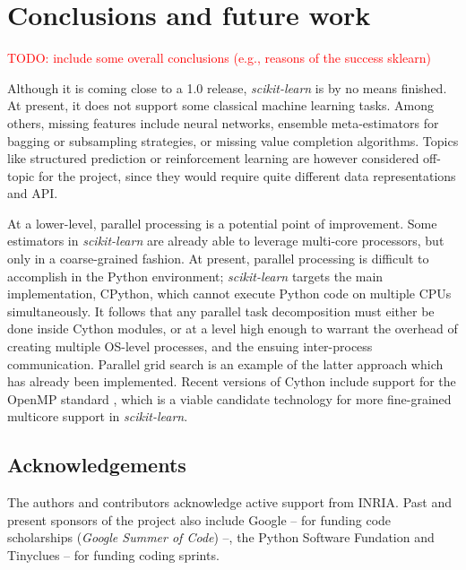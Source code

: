 \documentclass{llncs}
\newcommand{\sklearn}{\textit{scikit-learn}\xspace}
\DeclareRobustCommand{\VAN}[3]{#2}
\begin{document}
\section{Conclusions and future work}
\label{sec:conclusions}

\textcolor{red}{TODO: include some overall conclusions (e.g., reasons of the success sklearn)}

Although it is coming close to a 1.0 release, \sklearn is by no means finished.
At present, it does not support some classical machine learning tasks. Among
others, missing features include neural networks, ensemble meta-estimators for
bagging or subsampling strategies, or missing value completion algorithms.
Topics like structured prediction or reinforcement learning are however
considered off-topic for the project, since they would require quite different
data representations and API.

At a lower-level, parallel processing is a potential point of improvement.
Some estimators in \sklearn are already able to leverage multi-core processors,
but only in a coarse-grained fashion.
At present, parallel processing is difficult to accomplish in the Python environment;
\sklearn targets the main implementation, CPython,
which cannot execute Python code on multiple CPUs simultaneously.
It follows that any parallel task decomposition must either be done
inside Cython modules,
or at a level high enough to warrant the overhead
of creating multiple OS-level processes,
and the ensuing inter-process communication.
Parallel grid search is an example of the latter approach
which has already been implemented.
Recent versions of Cython include support for the OpenMP standard
\citep{dagum1998openmp},
which is a viable candidate technology
for more fine-grained multicore support in \sklearn.

\subsection*{Acknowledgements}

The authors and contributors acknowledge active support from INRIA. Past and
present sponsors of the project also include Google -- for funding code
scholarships (\textit{Google Summer of Code}) --, the Python Software Fundation and
Tinyclues -- for funding coding sprints.


\DeclareRobustCommand{\VAN}[3]{#3}

\end{document}

